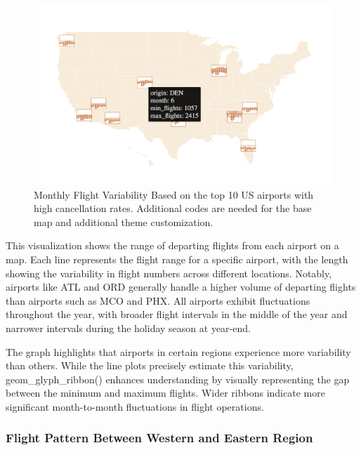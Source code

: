 \begin{figure}

{\centering \includegraphics[width=1\linewidth]{figures/monthly-flight-variability} 

}

\caption{Monthly Flight Variability Based on the top 10 US airports with high cancellation rates. Additional codes are needed for the base map and additional theme customization.}\label{fig:unnamed-chunk-23}
\end{figure}

This visualization shows the range of departing flights from each airport on a map. Each line represents the flight range for a specific airport, with the length showing the variability in flight numbers across different locations. Notably, airports like ATL and ORD generally handle a higher volume of departing flights than airports such as MCO and PHX. All airports exhibit fluctuations throughout the year, with broader flight intervals in the middle of the year and narrower intervals during the holiday season at year-end.

The graph highlights that airports in certain regions experience more variability than others. While the line plots precisely estimate this variability, geom\_glyph\_ribbon() enhances understanding by visually representing the gap between the minimum and maximum flights. Wider ribbons indicate more significant month-to-month fluctuations in flight operations.

\hypertarget{flight-pattern-between-western-and-eastern-region}{%
\subsubsection{Flight Pattern Between Western and Eastern Region}\label{flight-pattern-between-western-and-eastern-region}}

